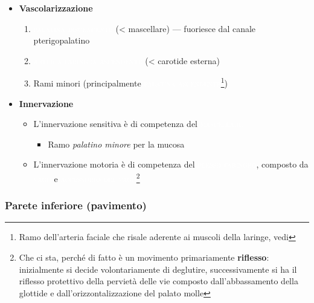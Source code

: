 \documentclass[italian,]{article}
\providecommand{\tightlist}{%
  \setlength{\itemsep}{0pt}\setlength{\parskip}{0pt}}
\newcommand{\art}[1]{\colorbox{RedOrange}{\textcolor{white}{\textsc{#1}}}}
\newcommand{\ner}[1]{\colorbox{Dandelion}{\textcolor{white}{\textsc{#1}}}}
\newcommand{\netter}[1]{ \fbox{\textsf{Netter (2014), tav. #1}} }
\begin{document}
\begin{itemize}
\tightlist
\item
  \textbf{Vascolarizzazione}

  \begin{enumerate}
  \def\labelenumi{\arabic{enumi}.}
  \tightlist
  \item
    \art{palatina discendente} (\textless{} mascellare) --- fuoriesce
    dal canale pterigopalatino
  \item
    \art{arteria faringea ascendente} (\textless{} carotide esterna)
  \item
    Rami minori (principalmente \art{palatina ascendente}\footnote{Ramo
      dell'arteria faciale che risale aderente ai muscoli della laringe,
      vedi \netter{68B}})
  \end{enumerate}
\item
  \textbf{Innervazione}

  \begin{itemize}
  \tightlist
  \item
    L'innervazione sensitiva è di competenza del \ner{mascellare}

    \begin{itemize}
    \tightlist
    \item
      Ramo \emph{palatino minore} per la mucosa
    \end{itemize}
  \item
    L'innervazione motoria è di competenza del \ner{plesso faringeo},
    composto da \ner{vago} e \ner{accessorio del vago}\footnote{Che ci
      sta, perché di fatto è un movimento primariamente
      \textbf{riflesso}: inizialmente si decide volontariamente di
      deglutire, successivamente si ha il riflesso protettivo della
      pervietà delle vie composto dall'abbassamento della glottide e
      dall'orizzontalizzazione del palato molle}
  \end{itemize}
\end{itemize}

\hypertarget{parete-inferiore-pavimento}{%
\subsubsection{\texorpdfstring{Parete inferiore (pavimento)
\label{lblmuscolisovraioidei}}{Parete inferiore (pavimento) }}\label{parete-inferiore-pavimento}}
\end{document}
